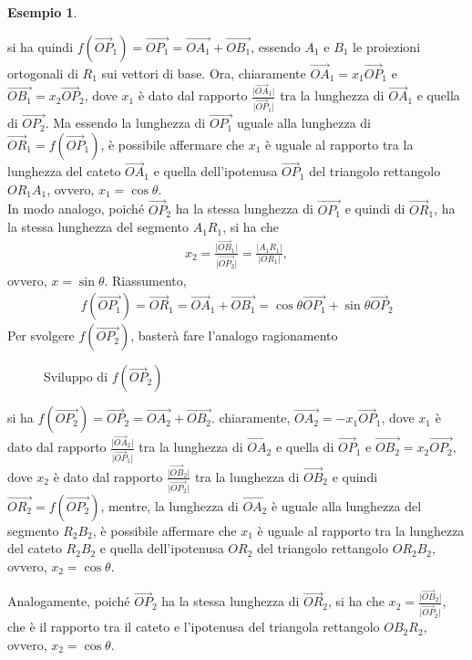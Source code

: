 \documentclass{book}
\newcommand{\abs}[1]{\lvert#1\rvert}
\theoremstyle{definition}
\newtheorem{es}{Esempio}[section]
\theoremstyle{plain}
\begin{document}
\begin{es}
\begin{enumerate}
    si ha quindi $f\left(\vec{OP}_1\right)=\vec{OP_1}=\vec{OA_1}+\vec{OB_1}$,
    essendo $A_1$ e $B_1$ le proiezioni ortogonali di $R_1$ sui vettori di
    base. Ora, chiaramente $\vec{OA}_1=x_1\vec{OP}_1$ e $\vec{OB_1}=x_2\vec{OP}_2$,
    dove $x_1$ è dato dal rapporto $\frac{\abs{\vec{OA}_1}}{\abs{\vec{OP}_1}}$ tra
    la lunghezza di $\vec{OA}_1$ e quella di $\vec{OP_2}$. Ma essendo la lunghezza
    di $\vec{OP_1}$ uguale alla lunghezza di $\vec{OR}_1=f(\vec{OP}_1)$, è possibile
    affermare che $x_1$ è uguale al rapporto tra la lunghezza del cateto $\vec{OA}_1$
    e quella dell'ipotenusa $\vec{OP}_1$ del triangolo rettangolo $OR_1A_1$, ovvero,
    $x_1=\cos\theta$.\\
    In modo analogo, poiché $\vec{OP}_2$ ha la stessa lunghezza di $\vec{OP_1}$ e
    quindi di $\vec{OR}_1$, ha la stessa lunghezza del segmento $A_1R_1$, si ha
    che
    \clearpage
    \begin{eqnarray*}
      x_2=\frac{\abs{\vec{OB}_1}}{\abs{\vec{OP_2}}}=\frac{\abs{A_1R_1}}{\abs{OR_1}},
    \end{eqnarray*}
    ovvero, $x=\sin\theta$. Riassumento,
    \begin{eqnarray}
      \label{eq:mtxAsaplin8}
      f(\vec{OP_1})=\vec{OR}_1=\vec{OA}_1+\vec{OB_1}=\cos{\theta}\vec{OP_1}+\sin\theta
      \vec{OP}_2
    \end{eqnarray}
    Per svolgere $f(\vec{OP_2})$, basterà fare l'analogo ragionamento
    \begin{figure}[ht!]
      \centering
      \resizebox{8cm}{!}{}
      \caption{Sviluppo di $f(\vec{OP}_2)$}
      \label{fig:mtxAsaplin3}
    \end{figure}

    si ha $f(\vec{OP_2})=\vec{OP}_2=\vec{OA_2}+\vec{OB_2}$. chiaramente,
    $\vec{OA_2}=-x_1\vec{OP}_1$, dove $x_1$ è dato dal rapporto $\frac{\abs{\vec{OA}_2}}
    {\abs{\vec{OP}_1}}$ tra la lunghezza di $\vec{OA}_2$ e quella di $\vec{OP}_1$ e
    $\vec{OB_2}=x_2\vec{OP_2}$, dove $x_2$ è dato dal rapporto $\frac{\abs{\vec{OB}_2}}
    {\abs{\vec{OP_2}}}$ tra la lunghezza di $\vec{OB}_2$ e quindi $\vec{OR_2}=f(\vec{OP_2})$,
    mentre, la lunghezza di $\vec{OA_2}$ è uguale alla lunghezza del segmento $R_2B_2$, è
    possibile affermare che $x_1$ è uguale al rapporto tra la lunghezza del cateto $R_2B_2$
    e quella dell'ipotenusa $OR_2$ del triangolo rettangolo $OR_2B_2$, ovvero, $x_2=\cos\theta$.
    
    Analogamente, poiché $\vec{OP}_2$ ha la stessa lunghezza di
    $\vec{OR}_2$, si ha che $x_2=\frac{\abs{\vec{OB}_2}}
    {\abs{\vec{OP}_2}}$, che è il rapporto tra il cateto e l'ipotenusa
    del triangola rettangolo $OB_2R_2$, ovvero, $x_2=\cos\theta$.


\end{enumerate}
\end{es}
\end{document}
